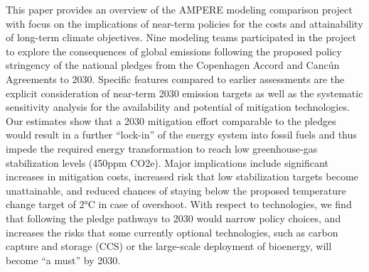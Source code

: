This paper provides an overview of the AMPERE modeling comparison project with focus on the implications of near-term policies for the costs and attainability of long-term climate objectives. Nine modeling teams participated in the project to explore the consequences of global emissions following the proposed policy stringency of the national pledges from the Copenhagen Accord and Cancún Agreements to 2030. Specific features compared to earlier assessments are the explicit consideration of near-term 2030 emission targets as well as the systematic sensitivity analysis for the availability and potential of mitigation technologies. Our estimates show that a 2030 mitigation effort comparable to the pledges would result in a further “lock-in” of the energy system into fossil fuels and thus impede the required energy transformation to reach low greenhouse-gas stabilization levels (450ppm CO2e). Major implications include significant increases in mitigation costs, increased risk that low stabilization targets become unattainable, and reduced chances of staying below the proposed temperature change target of 2°C in case of overshoot. With respect to technologies, we find that following the pledge pathways to 2030 would narrow policy choices, and increases the risks that some currently optional technologies, such as carbon capture and storage (CCS) or the large-scale deployment of bioenergy, will become “a must” by 2030.
